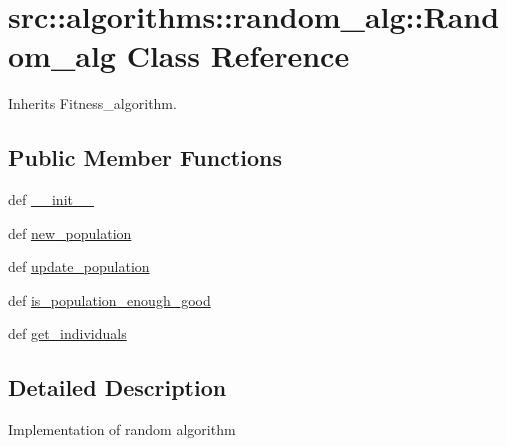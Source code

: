 \hypertarget{classsrc_1_1algorithms_1_1random__alg_1_1Random__alg}{
\section{src::algorithms::random\_\-alg::Random\_\-alg Class Reference}
\label{classsrc_1_1algorithms_1_1random__alg_1_1Random__alg}
}


Inherits Fitness\_\-algorithm.

\subsection*{Public Member Functions}
\begin{DoxyCompactItemize}
\item 
def \hyperlink{classsrc_1_1algorithms_1_1random__alg_1_1Random__alg_ac684d20035f0d10654a1d027172dbd0f}{\_\-\_\-init\_\-\_\-}
\item 
def \hyperlink{classsrc_1_1algorithms_1_1random__alg_1_1Random__alg_a5f9d350c6ee324f4867ba34929b63543}{new\_\-population}
\item 
def \hyperlink{classsrc_1_1algorithms_1_1random__alg_1_1Random__alg_a1152c3697606bd1b56bdab839e9f1b64}{update\_\-population}
\item 
def \hyperlink{classsrc_1_1algorithms_1_1random__alg_1_1Random__alg_aaabc794712686913965ec8a9a2c6354c}{is\_\-population\_\-enough\_\-good}
\item 
def \hyperlink{classsrc_1_1algorithms_1_1random__alg_1_1Random__alg_a25a977c1aa28a0b0768d64de0124d31b}{get\_\-individuals}
\end{DoxyCompactItemize}


\subsection{Detailed Description}
\begin{DoxyVerb}
Implementation of random algorithm
\end{DoxyVerb}
 

